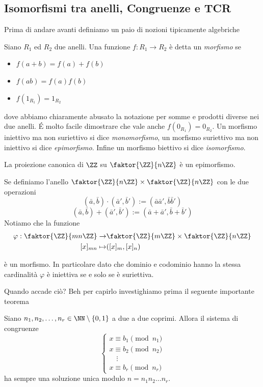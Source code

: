 \documentclass[11pt]{scrartcl}
\begin{document}
	\subsection{Isomorfismi tra anelli, Congruenze e TCR}
	Prima di andare avanti definiamo un paio di nozioni tipicamente algebriche
	\begin{definition}
		Siano $R_1$ ed $R_2$ due anelli. Una funzione $f:R_1\to R_2$ è detta un \textit{morfismo} se 
		\begin{itemize}
			\item $f(a+b)=f(a)+f(b)$
			\item $f(ab)=f(a)f(b)$
			\item $f(1_{R_1})=1_{R_2}$
		\end{itemize}
		dove abbiamo chiaramente abusato la notazione per somme e prodotti diverse nei due anelli. \'E molto facile dimostrare che vale anche $f(0_{R_1})=0_{R_2}$. Un morfismo iniettivo ma non suriettivo si dice \textit{monomorfismo}, un morfismo suriettivo ma non iniettivo si dice \textit{epimorfismo}. Infine un morfismo biettivo si dice \textit{isomorfismo}.
	\end{definition}
	\begin{example}
		La proiezione canonica di $\ZZ$ su $\faktor{\ZZ}{n\ZZ}$ è un epimorfismo.
	\end{example}
	\begin{example}
		Se definiamo l'anello $\faktor{\ZZ}{n\ZZ}\times \faktor{\ZZ}{n\ZZ}$ con le due operazioni 
		$$(\bar{a},\bar{b})\cdot (\bar{a}',\bar{b}'):= (\bar{a}\bar{a}',\bar{b}\bar{b}')$$
		$$(\bar{a},\bar{b})+ (\bar{a}',\bar{b}'):=(\bar{a}+\bar{a}',\bar{b}+\bar{b}')$$
		Notiamo che la funzione 
		\begin{align*}
			\varphi:\faktor{\ZZ}{mn\ZZ}\to &\faktor{\ZZ}{m\ZZ}\times \faktor{\ZZ}{n\ZZ}\\
			[x]_{mn}\mapsto & ([x]_m,[x]_n)
		\end{align*}
		
		è un morfismo. In particolare dato che dominio e codominio hanno la stessa cardinalità $\varphi$ è iniettiva se e solo se è suriettiva.
	\end{example}
	Quando accade ciò? Beh per capirlo investighiamo prima il seguente importante teorema
	\begin{theorem}
		Siano $n_1,n_2,\dots,n_r\in\NN\setminus\left\{0,1\right\}$ a due a due coprimi. Allora il sistema di congruenze
		$$
		\begin{cases}
			x\equiv  b_1 \pmod{n_1} \\
			x\equiv  b_2 \pmod{n_2} \\
			\quad \vdots\\
			x\equiv b_r \pmod{n_r}
		\end{cases} 
		$$
		ha sempre una soluzione unica modulo $n=n_1n_2\dots n_r$.
	\end{theorem}
\end{document}
